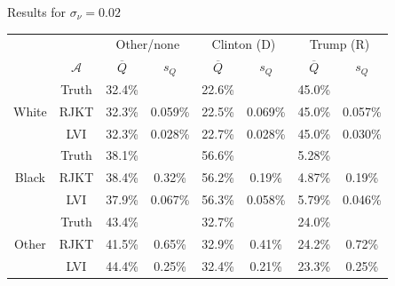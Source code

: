 \documentclass[
  ignorenonframetext,
]{beamer}
\begin{document}
\begin{frame}{Results for \(\sigma_\nu=0.02\)}
\protect\hypertarget{results-for-sigma_nu0.02}{}

\begin{table}[htbp]
 \label{results0.3}
 \begin{tabular}{cc|cc|cc|cc}
       \multicolumn{2}{c}{}   & \multicolumn{2}{c}{Other/none} & \multicolumn{2}{c}{Clinton (D)} & \multicolumn{2}{c}{Trump (R)} \\
                   &$\mathcal{A}$       &  $\overline{Q}$         &   $s_Q$       &  $\overline{Q}$         &   $s_Q$     &  $\overline{Q}$         &   $s_Q$          \\
 \hline
\multirow{3}{*}{White} & Truth & 32.4\% &  & 22.6\% &  & 45.0\% &  \\ 
   & RJKT & 32.3\% & 0.059\% & 22.5\% & 0.069\% & 45.0\% & 0.057\% \\ 
   & LVI & 32.3\% & 0.028\% & 22.7\% & 0.028\% & 45.0\% & 0.030\% \\ 
   \hline 
  \multirow{3}{*}{Black} & Truth & 38.1\% &  & 56.6\% &  & 5.28\% &  \\ 
   & RJKT & 38.4\% & 0.32\% & 56.2\% & 0.19\% & 4.87\% & 0.19\% \\ 
   & LVI & 37.9\% & 0.067\% & 56.3\% & 0.058\% & 5.79\% & 0.046\% \\ 
   \hline 
  \multirow{3}{*}{Other} & Truth & 43.4\% &  & 32.7\% &  & 24.0\% &  \\ 
   & RJKT & 41.5\% & 0.65\% & 32.9\% & 0.41\% & 24.2\% & 0.72\% \\ 
   & LVI & 44.4\% & 0.25\% & 32.4\% & 0.21\% & 23.3\% & 0.25\% \\ 
   \hline 
 \end{tabular}
 \end{table}

\end{frame}
\end{document}
